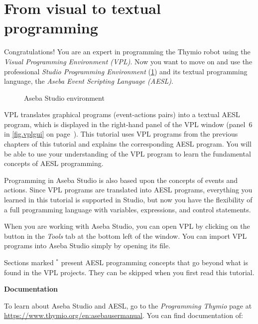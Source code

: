 \part{From visual to textual programming}

\label{ch.next}


Congratulations! You are an expert in programming the Thymio robot using
the \textit{Visual Programming Environment (VPL)}. Now you want to move
on and use the professional \textit{Studio Programming Environment}
(\cref{fig.studio}) and its textual programming language, the
\textit{Aseba Event Scripting Language (AESL)}.

\begin{figure}[hbt]
\begin{center}
\caption{Aseba Studio environment}\label{fig.studio}
\end{center}
\end{figure}

VPL translates graphical programs (event-actions pairs) into a textual
AESL program, which is displayed in the right-hand panel of the VPL
window (panel~6 in \cref{fig.vplgui} on page~\pageref{fig.vplgui}). This tutorial uses VPL programs
from the previous chapters of this tutorial and explains the
corresponding AESL program. You will be able to use your understanding
of the VPL program to learn the fundamental concepts of AESL
programming.

Programming in Aseba Studio is also based upon the concepts of events
and actions. Since VPL programs are translated into AESL programs,
everything you learned in this tutorial is supported in Studio, but now
you have the flexibility of a full programming language with variables,
expressions, and control statements.

When you are working with Aseba Studio, you can open VPL by clicking on
the button  in the \emph{Tools} tab at the bottom left of
the window. You can import VPL programs into Aseba Studio simply by
opening its file.

Sections marked $^*$ present AESL programming concepts that
go beyond what is found in the VPL projects. They can be skipped when
you first read this tutorial.

\newpage

\textbf{\large Documentation}

To learn about Aseba Studio and AESL, go to the \emph{Programming
Thymio} page at\\
\href{https://www.thymio.org/en:asebausermanual}{https://www.thymio.org/en:asebausermanual}.
You can find documentation of:

